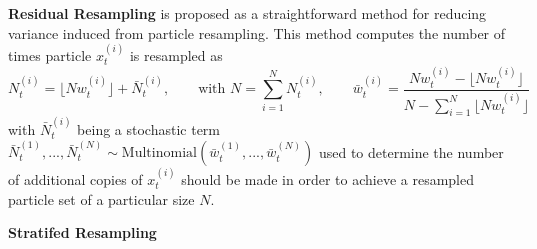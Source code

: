         \textbf{Residual Resampling} \cite{liu1998sequential,douc2005comparison, whitley1994genetic} is proposed as a straightforward method for reducing variance induced from particle resampling.  This method computes the number of times particle $x_t^{(i)}$ is resampled as
        \begin{equation*}
             N_t^{(i)} = \lfloor Nw_t^{(i)} \rfloor + \bar{N}_t^{(i)}, \qquad \text{with } N = \sum_{i=1}^N N_t^{(i)}, \qquad \bar{w}_t^{(i)} = \frac{Nw_t^{(i)} - \lfloor Nw_t^{(i)} \rfloor}{N - \sum_{i=1}^N \lfloor Nw_t^{(i)} \rfloor}
            \label{eqn:residual_resampling}
        \end{equation*}	
        with $\bar{N}_t^{(i)}$ being a stochastic term $\bar{N}_t^{(1)}, ..., \bar{N}_t^{(N)} \sim \text{Multinomial}(\bar{w}_t^{(1)}, ..., \bar{w}_t^{(N)}) $ used to determine the number of additional copies of $x_t^{(i)}$ should be made in order to achieve a resampled particle set of a particular size $N$. 

        \textbf{Stratifed Resampling}
